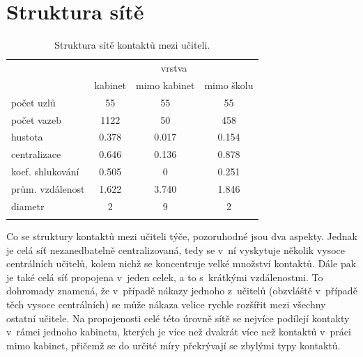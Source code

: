 \section*{Struktura sítě} 

\begin{table}
    \centering
    \caption{Struktura sítě kontaktů mezi učiteli.}
\begin{tabular}{lccc}
\hline
                 & \multicolumn{3}{c}{vrstva}                                                                      \\ 
                 & \multicolumn{1}{l}{kabinet} & \multicolumn{1}{l}{mimo kabinet} & \multicolumn{1}{l}{mimo školu} \\ \hline
počet uzlů       & 55                          & 55                               & 55                             \\
počet vazeb      & 1122                        & 50                               & 458                            \\
hustota          & 0.378                       & 0.017                            & 0.154                          \\
centralizace     & 0.646                       & 0.136                            & 0.878                          \\
koef. shlukování & 0.505                       & 0                                & 0.251                          \\
prům. vzdálenost & 1.622                       & 3.740                            & 1.846                          \\
diametr          & 2                           & 9                                & 2                              \\ \hline
\label{table:100-teachers}
\end{tabular}
\end{table}

Co se struktury kontaktů mezi učiteli týče, pozoruhodné jsou dva aspekty. Jednak je celá síť nezanedbatelně centralizovaná, tedy se v~ní vyskytuje několik vysoce centrálních učitelů, kolem nichž se koncentruje velké množství kontaktů. Dále pak je také celá síť propojena v~jeden celek, a to s~krátkými vzdálenostmi. To dohromady znamená, že v~případě nákazy jednoho z~učitelů (obzvláště v~případě těch vysoce centrálních) se může nákaza velice rychle rozšířit mezi všechny ostatní učitele. Na propojenosti celé této úrovně sítě se nejvíce podílejí kontakty v~rámci jednoho kabinetu, kterých je více než dvakrát více než kontaktů v~práci mimo kabinet, přičemž se do určité míry překrývají se zbylými typy kontaktů. 

